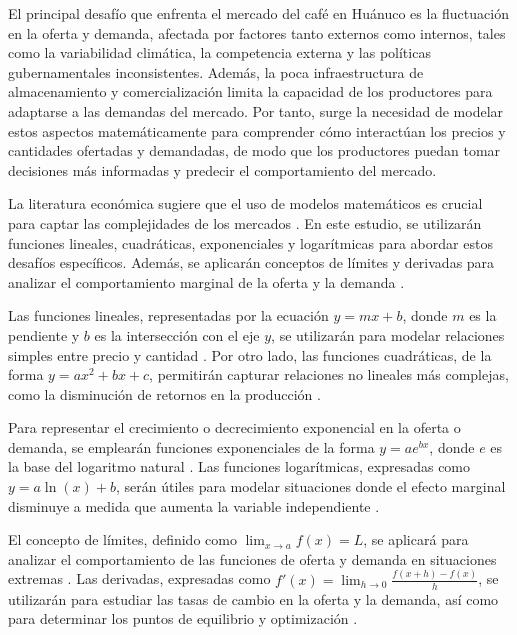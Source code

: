 \documentclass[12pt, a4paper]{article}
\begin{document}
El principal desafío que enfrenta el mercado del café en Huánuco es la fluctuación en la oferta y demanda, afectada por factores tanto externos como internos, tales como la variabilidad climática, la competencia externa y las políticas gubernamentales inconsistentes. Además, la poca infraestructura de almacenamiento y comercialización limita la capacidad de los productores para adaptarse a las demandas del mercado. Por tanto, surge la necesidad de modelar estos aspectos matemáticamente para comprender cómo interactúan los precios y cantidades ofertadas y demandadas, de modo que los productores puedan tomar decisiones más informadas y predecir el comportamiento del mercado.

La literatura económica sugiere que el uso de modelos matemáticos es crucial para captar las complejidades de los mercados \parencite{samuelson2010}. En este estudio, se utilizarán funciones lineales, cuadráticas, exponenciales y logarítmicas para abordar estos desafíos específicos. Además, se aplicarán conceptos de límites y derivadas para analizar el comportamiento marginal de la oferta y la demanda \parencite{varian2014}.

Las funciones lineales, representadas por la ecuación $y = mx + b$, donde $m$ es la pendiente y $b$ es la intersección con el eje $y$, se utilizarán para modelar relaciones simples entre precio y cantidad \parencite{nicholson2017}. Por otro lado, las funciones cuadráticas, de la forma $y = ax^2 + bx + c$, permitirán capturar relaciones no lineales más complejas, como la disminución de retornos en la producción \parencite{mas2018}.

Para representar el crecimiento o decrecimiento exponencial en la oferta o demanda, se emplearán funciones exponenciales de la forma $y = ae^{bx}$, donde $e$ es la base del logaritmo natural \parencite{chiang2005}. Las funciones logarítmicas, expresadas como $y = a\ln(x) + b$, serán útiles para modelar situaciones donde el efecto marginal disminuye a medida que aumenta la variable independiente \parencite{sydsaeter2014}.

El concepto de límites, definido como $\lim_{x \to a} f(x) = L$, se aplicará para analizar el comportamiento de las funciones de oferta y demanda en situaciones extremas \parencite{stewart2012}. Las derivadas, expresadas como $f'(x) = \lim_{h \to 0} \frac{f(x+h) - f(x)}{h}$, se utilizarán para estudiar las tasas de cambio en la oferta y la demanda, así como para determinar los puntos de equilibrio y optimización \parencite{anton2013}.
\end{document}
